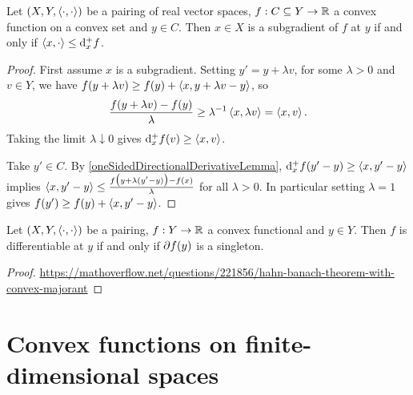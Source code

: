 \begin{proposition}
Let $\sSet{X,Y,\pair{\cdot,\cdot}}$ be a pairing of real vector spaces, $f: C\subseteq Y\to \mathbb{R}$ a convex function on a convex set and $y\in C$. Then $x\in X$ is a subgradient of $f$ at $y$ \textup{if and only if} $\left\langle x, \cdot \right\rangle \leq \operatorname{d \!}{^+_x f}$.
\end{proposition}
\begin{proof}
First assume $x$ is a subgradient. Setting $y' = y + \lambda v$, for some $\lambda > 0$ and $v\in Y$, we have $f(y+\lambda v) \geq f(y) + \left\langle x, y+\lambda v - y \right\rangle$, so
\[ \frac{f(y+\lambda v) - f(y)}{\lambda} \geq \lambda^{-1}\left\langle x, \lambda v \right\rangle = \left\langle x,v \right\rangle. \]
Taking the limit $\lambda\downarrow 0$ gives $\operatorname{d \!}{^+_x f}(v) \geq \left\langle x,v \right\rangle$.

Take $y'\in C$. By \ref{oneSidedDirectionalDerivativeLemma}, $\operatorname{d \!}{^+_x f}(y'-y) \geq \left\langle x,y'-y \right\rangle$ implies $\left\langle x,y'-y \right\rangle \leq \frac{f\big(y+ \lambda(y'-y)\big)-f(x)}{\lambda}$ for all $\lambda >0$. In particular setting $\lambda =1$ gives $f(y')\geq f(y) + \left\langle x, y'-y \right\rangle$.
\end{proof}

\begin{proposition}
Let $\sSet{X,Y,\pair{\cdot,\cdot}}$ be a pairing, $f: Y\to \mathbb{R}$ a convex functional and $y\in Y$. Then $f$ is differentiable at $y$ \textup{if and only if} $\partial f(y)$ is a singleton.
\end{proposition}
\begin{proof}
\url{https://mathoverflow.net/questions/221856/hahn-banach-theorem-with-convex-majorant}
\end{proof}

\section{Convex functions on finite-dimensional spaces}
